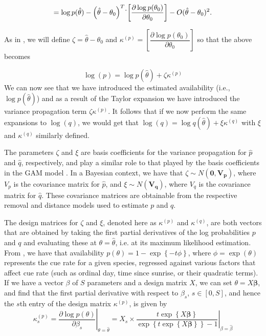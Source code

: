 $$ = \log p(\hat{\theta}) - \left( \hat{\theta} - \theta_0 \right)^T \dot \\ \left[ \dfrac{\partial \log p({\theta_0})}{\partial {\theta_0}}  \right] - O(\hat{\theta} - \theta_0)^2. $$

As in \citet{bravington_variance_2021}, we will define $\zeta = \hat{\theta} - \theta_0$ and $\kappa^{(p)} = \left[ \dfrac{\partial \log p({\theta_0})}{\partial {\theta_0}}  \right]$ so that the above becomes

$$\log(p) = \log p(\hat{\theta}) + \zeta\kappa^{(p)}$$
We can now see that we have introduced the estimated availability (i.e., $\log p(\hat{\theta})$) and as a result of the Taylor expansion we have introduced the variance propagation term $\zeta\kappa^{(p)}$.
It follows that if we now perform the same expansions to $\log(q)$, we would get that $\log(q) = \log q(\hat{\theta}) + \xi\kappa^{(q)}$ with $\xi$ and $\kappa^{(q)}$ similarly defined.

\par The parameters $\zeta$ and $\xi$ are basis coefficients for the variance propagation for $\hat{p}$ and $\hat{q}$, respectively, and play a similar role to that played by the basis coefficients in the GAM model \citep{bravington_variance_2021}. 
In a Bayesian context, we have that $\zeta \sim N(\boldsymbol{0}, \boldsymbol{V_p})$, where $V_p$ is the covariance matrix for $\hat{p}$, and $\xi \sim N(\boldsymbol{V_q})$, where $V_q$ is the covariance matrix for $\hat{q}$.
These covariance matrices are obtainable from the respective removal and distance models used to estimate $p$ and $q$.

\par The design matrices for $\zeta$ and $\xi$, denoted here as $\kappa^{(p)}$ and $\kappa^{(q)}$, are both vectors that are obtained by taking the first partial derivatives of the log probabilities $p$ and $q$ and evaluating these at $\theta = \hat{\theta}$, i.e. at its maximum likelihood estimation. 
From \citet{solymos_calibrating_2013}, we have that availability $p(\theta) = 1 - \exp\left\{-t\phi\right\}$, where $\phi = \exp\left(\theta\right)$ represents the cue rate for a given species, regressed against various factors that affect cue rate (such as ordinal day, time since sunrise, or their quadratic terms). 
If we have a vector {\boldmath$\beta$} of $S$ parameters and a design matrix $X$, we can set $\theta = X\boldsymbol{\beta}$, and find that the first partial derivative with respect to $\beta_s$, $s \in \left[0, S\right]$, and hence the $s$th entry of the design matrix $\kappa^{(p)}$, is given by
\begin{equation*}\label{kappa_p}
	\kappa_{s}^{(p)} = \left.\dfrac{\partial \log p(\theta)}{\partial \beta_s}\right\vert_{\theta = \hat{\theta}} = \left. X_s \times \dfrac{t \exp\left\{X\boldsymbol{\beta}\right\}}{\exp\left\{t \exp\left\{X\boldsymbol{\beta}\right\}\right\} - 1} \right\vert_{\beta = \hat{\beta}}
\end{equation*}

